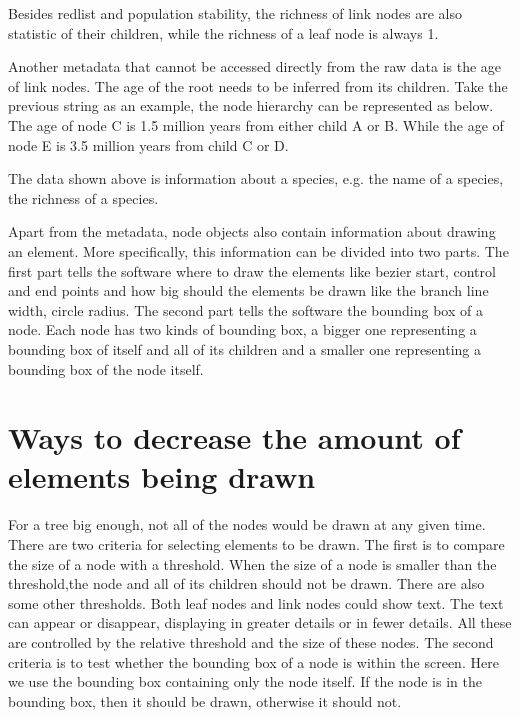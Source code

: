 \documentclass[a4paper,11pt,twoside]{report}
\begin{document}
Besides redlist and population stability, the richness of link nodes are also statistic of their children, while the richness of a leaf node is always 1. 

Another metadata that cannot be accessed directly from the raw data is the age of link nodes. The age of the root needs to be inferred from its children. Take the previous string as an example, the node hierarchy can be represented as below. The age of node C is 1.5 million years from either child A or B. While the age of node E is 3.5 million years from child C or D.

\begin{center}
\end{center}

The data shown above is information about a species, e.g. the name of a species, the richness of a species. 

Apart from the metadata, node objects also contain information about drawing an element. More specifically, this information can be divided into two parts. The first part tells the software where to draw the elements like bezier start, control and end points and how big should the elements be drawn like the branch line width, circle radius. The second part tells the software the bounding box of a node. Each node has two kinds of bounding box, a bigger one representing a bounding box of itself and all of its children and a smaller one representing a bounding box of the node itself. 


\section{Ways to decrease the amount of elements being drawn}

For a tree big enough, not all of the nodes would be drawn at any given time. There are two criteria for selecting elements to be drawn. The first is to compare the size of a node with a threshold. When the size of a node is smaller than the threshold,the node and all of its children should not be drawn. There are also some other thresholds. Both leaf nodes and link nodes could show text. The text can appear or disappear, displaying in greater details or in fewer details. All these are controlled by the relative threshold and the size of these nodes. The second criteria is to test whether the bounding box of a node is within the screen. Here we use the bounding box containing only the node itself. If the node is in the bounding box, then it should be drawn, otherwise it should not. 
\end{document}
